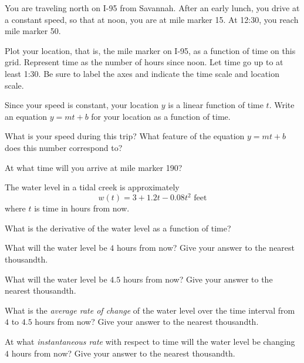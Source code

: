 
You are traveling north on I-95 from Savannah.
After an early lunch, you drive at a constant speed, so that at noon, you are at mile marker 15.
At 12:30, you reach mile marker 50.

\begin{ProblemSet}
 \begin{Problem}[pencil space=0in]
  Plot your location, that is, the mile marker on I-95, as a function of time on this grid.
  Represent time as the number of hours since noon.
  Let time go up to at least 1:30.
  Be sure to label the axes and indicate the time scale and location scale.

  \bigskip
  \GraphingGridSmall

 \end{Problem}
 \begin{Problem}
  Since your speed is constant, your location $y$ is a linear function of time $t$.
  Write an equation $y = m t + b$ for your location as a function of time.
 \end{Problem}
 \begin{Problem}[pencil space=0.5in]
  What is your speed during this trip?
  What feature of the equation $y = m t + b$ does this number correspond to?
 \end{Problem}
 \begin{Problem}[pencil space=0.5in]
  At what time will you arrive at mile marker 190?
 \end{Problem}
\end{ProblemSet}

\newpage
The water level in a tidal creek is approximately
\begin{equation*}
 w(t) = 3 + 1.2 t - 0.08 t^2 \text{ feet}
\end{equation*}
where $t$ is time in hours from now.

\begin{ProblemSet}[pencil space=2in]
 \begin{Problem}
  What is the derivative of the water level as a function of time?
 \end{Problem}
 \begin{Problem}
  What will the water level be $4$ hours from now?
  Give your answer to the nearest thousandth.
 \end{Problem}
 \begin{Problem}
  What will the water level be $4.5$ hours from now?
  Give your answer to the nearest thousandth.
 \end{Problem}
 \begin{Problem}
  What is the \emph{average rate of change} of the water level over the time interval from $4$ to $4.5$ hours from now?
  Give your answer to the nearest thousandth.
 \end{Problem}
 \begin{Problem}
  At what \emph{instantaneous rate} with respect to time will the water level be changing $4$ hours from now?
  Give your answer to the nearest thousandth.
 \end{Problem}
\end{ProblemSet}

